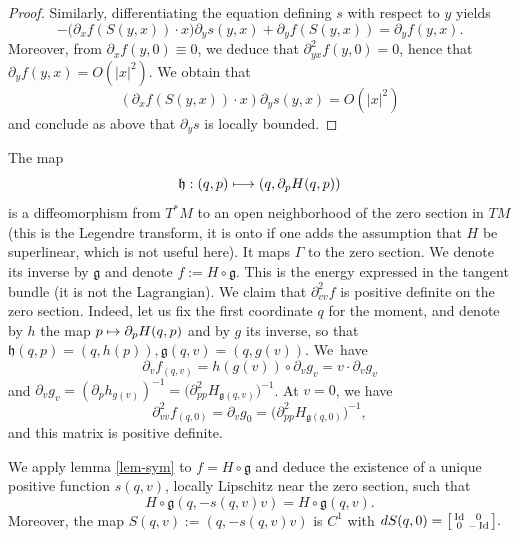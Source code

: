 \documentclass[JEP,XML,SOM,Unicode,published]{cedram}
\newcommand\mto{\mathchoice{\longmapsto}{\mapsto}{\mapsto}{\mapsto}}
\newenvironment{smallbmatrix}{\big[\begin{smallmatrix}}{\end{smallmatrix}\big]}
\DeclareMathOperator{\Id}{Id}
\theoremstyle{plain}
\theoremstyle{definition}
\begin{document}
\begin{proof}
Similarly, differentiating the equation defining $s$ with respect to $y$ yields
\[
-\big(\partial_xf(S(y,x))\cdot x \big) \partial_y s(y,x)+ \partial_y f(S(y,x))=\partial_y f(y,x).
\]
Moreover, from $\partial_xf(y,0)\equiv 0$, we deduce that $\partial^2_{yx}f (y,0)=0$, hence that
$\partial_yf(y,x)= O(|x|^2)$.
We obtain that
\[
(\partial_xf({S(y,x)})\cdot x ) \partial_y s(y,x)=O(|x|^2)
\]
and conclude as above that $\partial_y s$ is locally bounded.
\end{proof}

The map
\[
\mathfrak{h}: (q,p)\mto (q, \partial_pH(q,p))
\]
is a diffeomorphism from $T^*M$ to an open neighborhood of the zero section in $TM$ (this is the Legendre transform, it is onto if one adds the assumption that $H$ be superlinear, which is not useful here).
It maps $\Gamma$ to the zero section. We denote its inverse by
$
\mathfrak{g}
$ and denote $f:= H\circ \mathfrak{g}$. This is the energy expressed in the tangent bundle
(it is not the Lagrangian).
We claim that $\partial^2_{vv}f$ is positive definite on the zero section.
Indeed, let us fix the first coordinate $q$ for the moment, and denote by $h$ the map $p\mto \partial_pH(q,p)$ and by $g$ its inverse, so that $\mathfrak{h}(q,p)=(q,h(p)),\mathfrak{g}(q,v)=(q,g(v))$.
We~have
\[
\partial_vf_{(q,v)}=
h(g(v))\circ \partial_vg_v
=v\cdot \partial_vg_v
\]
and $\partial_vg_v= (\partial_ph_{g(v)})^{-1}=\big(\partial^2_{pp}H_{\mathfrak{g}(q,v)}\big)^{-1}$.
At $v=0$, we have
\[
\partial^2_{vv}f_{(q,0)}=\partial_vg_0=\big(\partial^2_{pp}H_{\mathfrak{g}(q,0)}\big)^{-1},
\]
and this matrix is positive definite.

We apply lemma \ref{lem-sym} to $f=H\circ \mathfrak{g}$ and deduce the existence of a unique positive function $s(q,v)$,
locally Lipschitz near the zero section, such that
\[
H\circ \mathfrak{g} (q, -s(q,v)v)=H\circ \mathfrak{g}(q, v).
\]
Moreover, the map $S(q,v):= (q, -s(q,v)v)$ is $C^1$ with
$dS(q,0)=
\begin{smallbmatrix}
\Id&0\\0&-\Id
\end{smallbmatrix}.$
\end{document}
